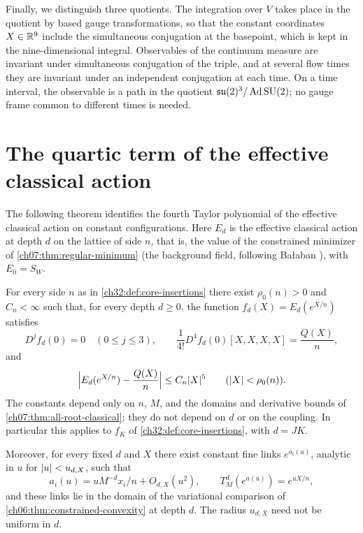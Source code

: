 Finally, we distinguish three quotients. The integration over $V$ takes place in the quotient by based gauge transformations, so that the constant coordinates $X\in\mathbb R^9$ include the simultaneous conjugation at the basepoint, which is kept in the nine-dimensional integral. Observables of the continuum measure are invariant under simultaneous conjugation of the triple, and at several flow times they are invariant under an independent conjugation at each time. On a time interval, the observable is a path in the quotient $\mathfrak{su}(2)^3/\operatorname{Ad}\mathrm{SU}(2)$; no gauge frame common to different times is needed.

\section{The quartic term of the effective classical action}\label{ch32:sec:quartic}

The following theorem identifies the fourth Taylor polynomial of the effective classical action on constant configurations. Here $E_d$ is the effective classical action at depth $d$ on the lattice of side $n$, that is, the value of the constrained minimizer of \cref{ch07:thm:regular-minimum} (the background field, following Ba{\l}aban \cite{Balaban1985Variational}), with $E_0=S_W$.

\begin{theorem}\label{ch32:thm:absolute-quartic}
For every side $n$ as in \cref{ch32:def:core-insertions} there exist $\rho_0(n)>0$ and $C_n<\infty$ such that, for every depth $d\ge0$, the function $f_d(X)=E_d(e^{X/n})$ satisfies
\[
 D^jf_d(0)=0\quad(0\le j\le3),\qquad \frac1{4!}D^4f_d(0)[X,X,X,X]=\frac{Q(X)}n,
\]
and
\begin{equation}\label{ch32:eq:absolute-quartic-remainder}
 \Bigl\lvert E_d(e^{X/n})-\frac{Q(X)}n\Bigr\rvert\le C_n\lvert X\rvert^5\qquad(\lvert X\rvert<\rho_0(n)).
\end{equation}
The constants depend only on $n$, $M$, and the domains and derivative bounds of \cref{ch07:thm:all-root-classical}; they do not depend on $d$ or on the coupling. In particular this applies to $f_K$ of \cref{ch32:def:core-insertions}, with $d=JK$.

Moreover, for every fixed $d$ and $X$ there exist constant fine links $e^{a_i(u)}$, analytic in $u$ for $\lvert u\rvert<u_{d,X}$, such that
\[
 a_i(u)=uM^{-d}x_i/n+O_{d,X}(u^2),\qquad T_M^d(e^{a(u)})=e^{uX/n},
\]
and these links lie in the domain of the variational comparison of \cref{ch06:thm:constrained-convexity} at depth $d$. The radius $u_{d,X}$ need not be uniform in $d$.
\end{theorem}

